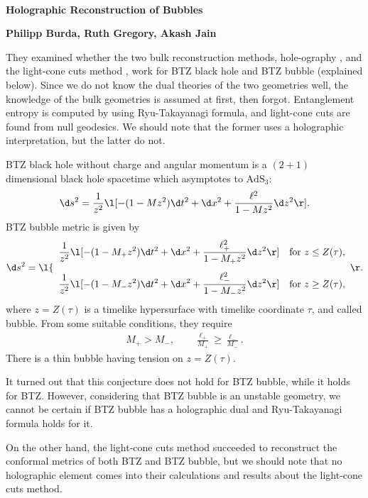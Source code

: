 \documentclass[12pt]{article}
\date{}
\renewcommand{\thefootnote}{\fnsymbol{footnote}}
\begin{document}
{\Large{}\\[2mm]
\textbf{Holographic Reconstruction of Bubbles\cite{Burda:2018rpb}
}
}

\noindent
\hfill
\textbf{Philipp Burda, Ruth Gregory, Akash Jain}%

\renewcommand{\thefootnote}{\arabic{footnote})}
\setcounter{footnote}{0}
\vspace{12pt}
They examined whether the two bulk reconstruction methods, hole-ography
\cite{Balasubramanian:2013lsa,Czech:2014ppa}, and the light-cone cuts method \cite{Engelhardt:2016wgb}, 
work for BTZ black hole and BTZ bubble (explained below).
Since we do not know the dual theories of the two geometries well,
the knowledge of the bulk geometries is assumed at first, then forgot.
Entanglement entropy is computed by using Ryu-Takayanagi formula, and light-cone cuts are found from null geodesics.
We should note that the former uses a holographic interpretation, but the latter do not.

BTZ black hole without charge and angular momentum is a $(2+1)$ dimensional black hole spacetime which asymptotes to $\mathrm{AdS}_3$:
\begin{align}
	\d s^2 = \frac{1}{z^2}\l[-(1-Mz^2)\d t^2 + \d x^2 + \frac{\ell^2}{1-Mz^2}\d z^2\r].
\end{align}
BTZ bubble metric is given by
\begin{align}
	\d s^2 = 
	\l\{
		\begin{array}{cc}
			\displaystyle \frac{1}{z^2}\l[-(1-M_+z^2)\d t^2 + \d x^2 + \frac{\ell_+^2}{1-M_+z^2}\d z^2\r] & \mathrm{for}~z\le Z(\tau),\\[5mm]
			\displaystyle\frac{1}{z^2}\l[-(1-M_-z^2)\d t^2 + \d x^2 + \frac{\ell_-^2}{1-M_-z^2}\d z^2\r] & \mathrm{for}~z\ge Z(\tau),
		\end{array}
	\r.
\end{align}
where $z = Z(\tau)$ is  a timelike hypersurface with timelike coordinate $\tau$, and called bubble.
From some suitable conditions, they require
\begin{align}
	M_+ > M_-,\qquad \frac{\ell_+}{M_+} \geq \frac{\ell_-}{M_-}.
\end{align}
There is a thin bubble having tension on $z = Z(\tau)$.

It turned out that this conjecture does not hold for BTZ bubble, while it holds for BTZ.
However, considering that BTZ bubble is an unstable geometry, we cannot be certain if
BTZ bubble has a holographic dual and Ryu-Takayanagi formula holds for it.

On the other hand, the light-cone cuts method succeeded to reconstruct the conformal metrics of both BTZ and BTZ bubble,
but we should note that no holographic element comes into their calculations and results about the light-cone cuts method.




 

\end{document}
